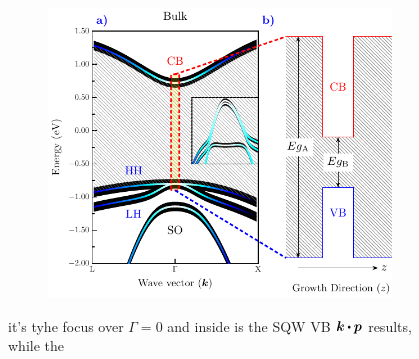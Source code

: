 \begin{figure}
	\centering
	\begin{subfigure}{\textwidth}
	\includegraphics[width=\textwidth]{../figures/chapter-2/numerical-calculations/out/band-edge}
	\label{subfig:chapter-2-sec-numerical-calculations-band-edge-a}
	\label{subfig:chapter-2-sec-numerical-calculations-band-edge-b}
	\end{subfigure}
	\caption{ it's tyhe focus over $\Gamma=0$ and inside is the SQW VB $\boldsymbol{k}\bigcdot \boldsymbol{p}$ results,  while the  }
	\label{fig:chapter-2-sec-numerical-calculations-band-edge}
\end{figure}


